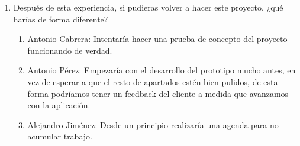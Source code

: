 \begin{enumerate}
\begin{enumerate}
    \end{enumerate}

    \item Después de esta experiencia, si pudieras volver a hacer este proyecto, ¿qué harías de
    forma diferente?
    \begin{enumerate}
        \item Antonio Cabrera: Intentaría hacer una prueba de concepto del proyecto funcionando de verdad.
        \item Antonio Pérez: Empezaría con el desarrollo del prototipo mucho antes, en vez de esperar a que el resto de apartados estén bien pulidos, de esta forma podríamos tener un feedback del cliente a medida que avanzamos con la aplicación.
        \item Alejandro Jiménez: Desde un principio realizaría una agenda para no acumular trabajo. 
    \end{enumerate}
\end{enumerate}


